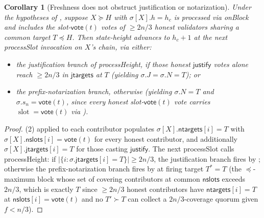 \documentclass{article}
\newcommand{\slot}[0]{\ensuremath{\operatorname{\mathrm{slot}}}}
\newcommand{\just}{\ensuremath{\mathsf{justify}}\xspace}
\newcommand{\jtargets}{\mathsf{jtargets}}
\newcommand{\ntargets}{\mathsf{ntargets}}
\newcommand{\nslots}{\mathsf{nslots}}
\newcommand{\vote}{\mathsf{vote}}
\newcommand{\processSlot}{\textsf{processSlot}\xspace}
\newcommand{\processHeight}{\textsf{processHeight}\xspace}
\newcommand{\onBlock}{\textsf{onBlock}\xspace}
\theoremstyle{plain}
\newtheorem{corollary}{Corollary}
\theoremstyle{definition}
\theoremstyle{remark}
\begin{document}
\begin{corollary}[Freshness does not obstruct justification or notarization]\label{cor:freshness-liveness}
Under the hypotheses of , suppose $X \succeq H$ with $\sigma[X].h = h_c$ is processed via \onBlock and includes the slot-$\vote(t)$ votes of $\geq 2n/3$ honest validators sharing a common target $T \preceq H$.
Then state-height advances to $h_c + 1$ at the next \processSlot invocation on $X$'s chain, via either:
\begin{itemize}
  \item the justification branch of \processHeight, if those honest \just votes alone reach $\geq 2n/3$ in $\jtargets$ at $T$ (yielding $\sigma.J = \sigma.N = T$); or
  \item the prefix-notarization branch, otherwise (yielding $\sigma.N = T$ and $\sigma.s_n = \vote(t)$, since every honest slot-$\vote(t)$ vote carries $\slot = \vote(t)$ via ).
\end{itemize}
\end{corollary}

\begin{proof}
(2) applied to each contributor populates $\sigma[X].\ntargets[i] = T$ with $\sigma[X].\nslots[i] = \vote(t)$ for every honest contributor, and additionally $\sigma[X].\jtargets[i] = T$ for those casting \just.
The next \processSlot calls \processHeight: if $|\{i : \sigma.\jtargets[i] = T\}| \geq 2n/3$, the justification branch fires by ; otherwise the prefix-notarization branch fires by  at firing target $T^* = T$ (the $\preceq$-maximum block whose set of covering contributors at common $\nslots$ exceeds $2n/3$, which is exactly $T$ since $\geq 2n/3$ honest contributors have $\ntargets[i] = T$ at $\nslots[i] = \vote(t)$ and no $T' \succ T$ can collect a $2n/3$-coverage quorum given $f < n/3$).
\end{proof}
\end{document}
